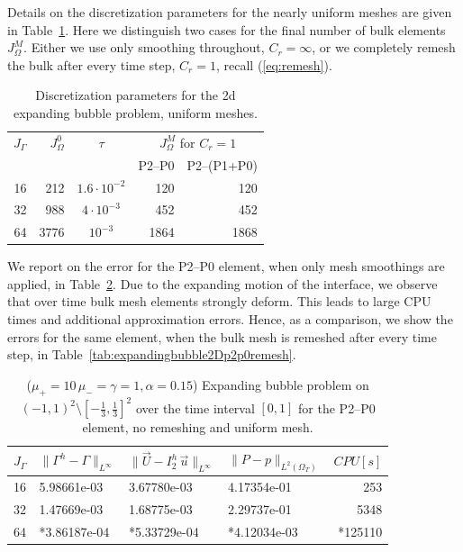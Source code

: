 \documentclass[a4paper,12pt,onecolumn]{article}
\newcommand{\errorXx}{\|\Gamma^h - \Gamma\|_{L^\infty}}
\newcommand{\errorUu}[1]{\|\vec U - I^h_{#1}\,\vec u\|_{L^\infty}}
\newcommand{\LerrorPp}{\|P - p\|_{L^2(\Omega_T)}}
\begin{document}
Details on the discretization parameters for the nearly uniform meshes are
given in Table~\ref{tab:expandingbubble2Delements}. Here we distinguish two
cases for the final number of bulk elements $J_\Omega^M$. Either we use only
smoothing throughout, $C_r = \infty$, or we completely remesh the bulk after 
every time step, $C_r = 1$, recall (\ref{eq:remesh}).
\begin{table}
\center
\begin{tabular}{rrcrr}
\hline
$J_\Gamma$ & $J_\Omega^0$ & $\tau$ & 
\multicolumn{2}{c}{$J_\Omega^M$ for $C_r=1$} \\
& & & P2--P0 & P2--(P1+P0) \\
\hline
16 &  212 & $1.6\cdot10^{-2}$ &  120 &  120 \\
32 &  988 &   $4\cdot10^{-3}$ &  452 &  452 \\
64 & 3776 &         $10^{-3}$ & 1864 & 1868 \\
\hline
\end{tabular}
\caption{Discretization parameters for the 2d expanding bubble problem, 
uniform meshes.}
\label{tab:expandingbubble2Delements}
\end{table}
We report on the error for the P2--P0 element, when only mesh smoothings are
applied, in Table~\ref{tab:expandingbubble2Dp2p0smooth}. Due to the expanding
motion of the interface, we observe that over time bulk mesh elements strongly 
deform. This leads to large CPU times and additional approximation errors.
Hence, as a comparison, we show the errors for the same element, when the bulk 
mesh is remeshed after every time step, in 
Table~\ref{tab:expandingbubble2Dp2p0remesh}.
\begin{table}
 \center
\begin{tabular}{llllr}
\hline
$J_\Gamma$ & $\errorXx$ & $\errorUu2$ & $\LerrorPp$ & $CPU[s]$\\
\hline
16 & 5.98661e-03 & 3.67780e-03 & 4.17354e-01 &  253 \\
32 & 1.47669e-03 & 1.68775e-03 & 2.29737e-01 & 5348 \\
64 & *3.86187e-04 & *5.33729e-04 & *4.12034e-03 & *125110\\
\hline
\end{tabular}
\caption{($\mu_+ = 10\,\mu_- = \gamma = 1,\alpha = 0.15$) Expanding bubble 
problem on $(-1,1)^2\setminus[-\frac{1}{3},\frac{1}{3}]^2$ over the time 
interval $[0,1]$ for the P2--P0 element, no remeshing and uniform mesh.}
\label{tab:expandingbubble2Dp2p0smooth}
\end{table}
\end{document}

